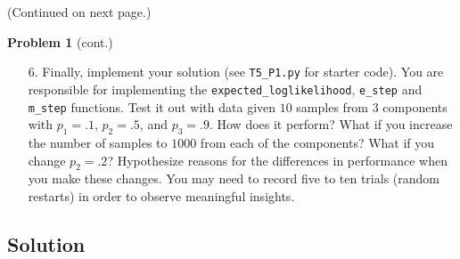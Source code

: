 \documentclass[submit]{harvardml}
\begin{document}
\begin{problem}
\begin{enumerate}
  (Continued on next page.)
  \end{enumerate}
  
  



\end{problem}

\newpage

\begin{framed}
\noindent\textbf{Problem 1} (cont.)\\
\begin{enumerate}

\item[6.] Finally, implement your solution (see \texttt{T5\_P1.py} for starter code).  You are responsible for implementing the \texttt{expected\_loglikelihood}, \texttt{e\_step} and \texttt{m\_step} functions. Test it out with data given
  $10$ samples from $3$ components with $p_1 = .1$, $p_2=.5$, and
  $p_3=.9$.  How does it perform?  What if you increase the number of
  samples to $1000$ from each of the components?  What if you change
  $p_2=.2$?  Hypothesize reasons for the differences in performance
  when you make these changes. You may need to record five to ten trials (random restarts) in order to observe meaningful insights.
\end{enumerate}
  
\end{framed}  

\subsection*{Solution}

\newpage
\end{document}
